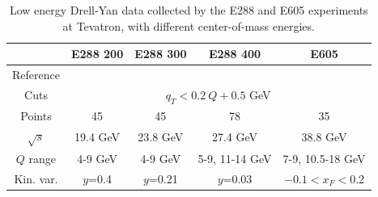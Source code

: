 \documentclass[aps,preprintnumbers,showpacs,nofootinbib,superscriptaddress,floatfix]{revtex4}
\begin{document}
\begin{table}[h!]
\begin{center}
\renewcommand{\tabcolsep}{0.4pc} %
\renewcommand{\arraystretch}{1.2} %
\begin{tabular}{|c|c|c|c|c|}
 \hline
 ~                        &  E288 200    &  E288 300        &  E288 400          &  E605                \\
 \hline
Reference               &  \cite{Ito:1980ev}  &   \cite{Ito:1980ev}  &  \cite{Ito:1980ev}  &   \cite{Moreno:1990sf}  \\
\hline
Cuts             & \multicolumn{4}{c|}{$q_T < 0.2\ Q +0.5$ GeV}
\\
 \hline
 Points                   &      45      &   45             &       78           &     35               \\
 \hline
 $\sqrt{s}$               &    19.4 GeV   &   23.8 GeV        &      27.4 GeV    &  38.8 GeV           \\
\hline
$Q$ range                 &  4-9 GeV      &  4-9 GeV         &  5-9, 11-14 GeV   &  7-9, 10.5-18 GeV   \\
 \hline
 Kin. var.           & $y$=0.4         &  $y$=0.21          &   $y$=0.03         &    $-0.1<x_F< 0.2$         \\
\hline
\end{tabular}
\caption{Low energy Drell-Yan data collected by the E288 and E605 experiments at Tevatron, with different center-of-mass energies.}
\end{center}
\label{t:data_DY}
\end{table}
\end{document}

